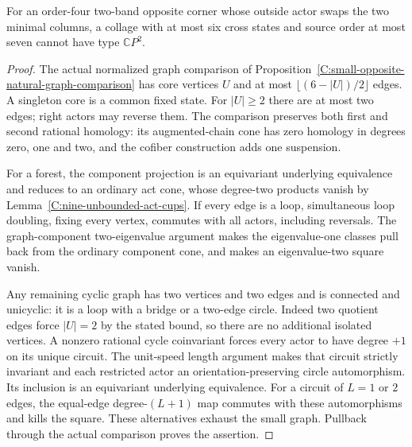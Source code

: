 \begin{lemma}
\label{C:four-corner-swap-six-state-graph}
For an order-four two-band opposite corner whose
outside actor swaps the two minimal columns,
a collage with at most six cross states and
source order at most seven cannot have type
$\mathbb CP^2$.
\end{lemma}
\begin{proof}
The actual normalized graph comparison of
Proposition~\ref{C:small-opposite-natural-graph-comparison}
has core vertices $U$ and at most
$\lfloor(6-|U|)/2\rfloor$ edges.
A singleton core is a common fixed state.
For $|U|\geq2$ there are at most two edges;
right actors may reverse them.
The comparison preserves both first and second
rational homology: its augmented-chain cone
has zero homology in degrees zero, one and two,
and the cofiber construction adds one suspension.

For a forest, the component projection is an
equivariant underlying equivalence and reduces
to an ordinary act cone, whose degree-two
products vanish by
Lemma~\ref{C:nine-unbounded-act-cups}.
If every edge is a loop,
simultaneous loop doubling, fixing every vertex,
commutes with all actors, including reversals.
The graph-component two-eigenvalue argument
makes the eigenvalue-one classes pull back
from the ordinary component cone, and makes
an eigenvalue-two square vanish.

Any remaining cyclic graph has two vertices
and two edges and is connected and unicyclic:
it is a loop with a bridge or a two-edge circle.
Indeed two quotient edges force $|U|=2$ by
the stated bound, so there are no additional
isolated vertices.  A nonzero rational cycle
coinvariant forces every actor to have degree
$+1$ on its unique circuit.  The unit-speed
length argument makes that circuit strictly
invariant and each restricted actor an
orientation-preserving circle automorphism.
Its inclusion is an equivariant underlying
equivalence.  For a circuit of $L=1$ or $2$
edges, the equal-edge degree-$(L+1)$ map
commutes with these automorphisms and kills
the square.
These alternatives exhaust the small graph.
Pullback through the actual comparison proves
the assertion.
\end{proof}

